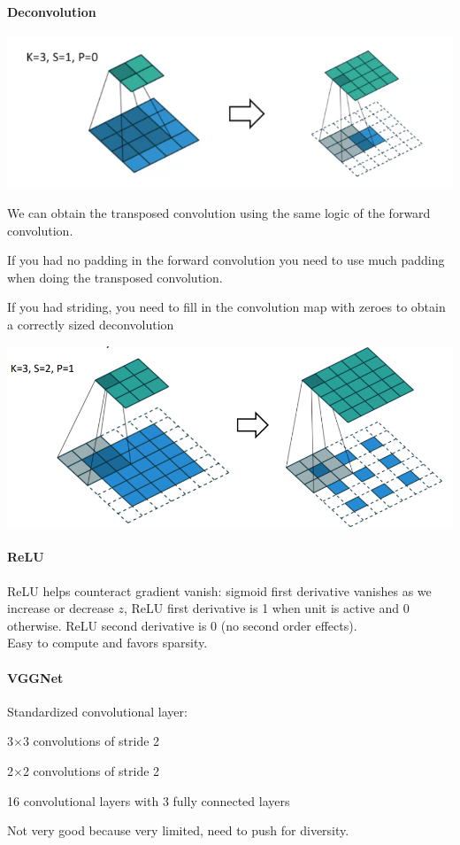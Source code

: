 \documentclass[10pt]{report}
\begin{document}
\paragraph{Deconvolution}
\begin{center}
	\includegraphics[scale=0.5]{63.png}
\end{center}
We can obtain the transposed convolution using the same logic of the forward convolution.
\begin{list}{}{}
	\item If you had no padding in the forward convolution you need to use much padding when doing the transposed convolution.
	\item If you had striding, you need to fill in the convolution map with zeroes to obtain a correctly sized deconvolution
	\begin{center}
		\includegraphics[scale=0.5]{213.png}
	\end{center}
\end{list}
\paragraph{ReLU} ReLU helps counteract gradient vanish: sigmoid first derivative vanishes as we increase or decrease $z$, ReLU first derivative is 1 when unit is active and 0 otherwise. ReLU second derivative is 0 (no second order effects).\\
Easy to compute and favors sparsity.
\paragraph{VGGNet} Standardized convolutional layer:
\begin{list}{}{}
	\item 3$\times$3 convolutions of stride 2
	\item 2$\times$2 convolutions of stride 2
	\item 16 convolutional layers with 3 fully connected layers
\end{list}
Not very good because very limited, need to push for diversity. 
\end{document}
